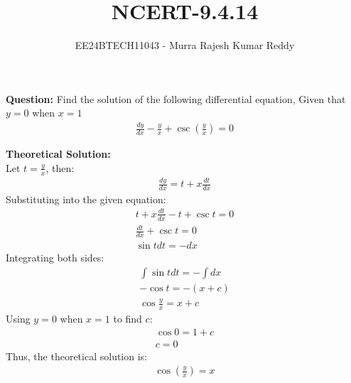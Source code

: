 \documentclass[journal]{IEEEtran}
\begin{document}
\title{NCERT-9.4.14}
\author{EE24BTECH11043 - Murra Rajesh Kumar Reddy}

\maketitle

\textbf{Question:}
Find the solution of the following differential equation, Given that $y=0$ when $x=1$
\begin{align}
\frac{dy}{dx} - \frac{y}{x} + \csc{\left(\frac{y}{x}\right)} = 0
\end{align}

\textbf{Theoretical Solution:} \\
Let $t = \frac{y}{x}$, then:
\begin{align}
    \frac{dy}{dx} = t + x\frac{dt}{dx}
\end{align}
Substituting into the given equation:
\begin{align}
    t + x\frac{dt}{dx} - t + \csc{t} = 0 \\
    \frac{dt}{dx} + \csc{t} = 0 \\
    \sin{t} dt = -dx
\end{align}
Integrating both sides:
\begin{align}
    \int \sin{t} dt = -\int dx \\
    -\cos{t} = - (x + c) \\
    \cos{\frac{y}{x}} = x + c
\end{align}
Using $y=0$ when $x=1$ to find $c$:
\begin{align}
    \cos{0} = 1 + c \\
    c = 0
\end{align}
Thus, the theoretical solution is:
\begin{align}
    \cos{\left(\frac{y}{x}\right)} = x
\end{align}
\end{document}
